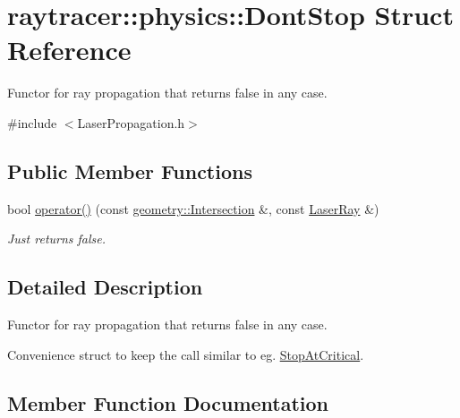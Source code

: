 \hypertarget{structraytracer_1_1physics_1_1DontStop}{}\section{raytracer\+:\+:physics\+:\+:Dont\+Stop Struct Reference}
\label{structraytracer_1_1physics_1_1DontStop}


Functor for ray propagation that returns false in any case.  




{\ttfamily \#include $<$Laser\+Propagation.\+h$>$}

\subsection*{Public Member Functions}
\begin{DoxyCompactItemize}
\item 
bool \hyperlink{structraytracer_1_1physics_1_1DontStop_a6024e2fafd616c903af29b2ed271568b}{operator()} (const \hyperlink{structraytracer_1_1geometry_1_1Intersection}{geometry\+::\+Intersection} \&, const \hyperlink{structraytracer_1_1physics_1_1LaserRay}{Laser\+Ray} \&)
\begin{DoxyCompactList}\small\item\em Just returns false. \end{DoxyCompactList}\end{DoxyCompactItemize}


\subsection{Detailed Description}
Functor for ray propagation that returns false in any case. 

Convenience struct to keep the call similar to eg. \hyperlink{structraytracer_1_1physics_1_1StopAtCritical}{Stop\+At\+Critical}. 

\subsection{Member Function Documentation}
\mbox{\label{structraytracer_1_1physics_1_1DontStop_a6024e2fafd616c903af29b2ed271568b}} 
